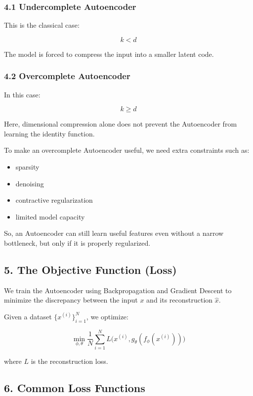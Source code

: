 \documentclass[
  italian,
  11pt,
]{article}
\begin{document}
\subsubsection{4.1 Undercomplete
Autoencoder}\label{undercomplete-autoencoder}

This is the classical case:

\[
k < d
\]

The model is forced to compress the input into a smaller latent code.

\subsubsection{4.2 Overcomplete
Autoencoder}\label{overcomplete-autoencoder}

In this case:

\[
k \ge d
\]

Here, dimensional compression alone does not prevent the Autoencoder
from learning the identity function.

To make an overcomplete Autoencoder useful, we need extra constraints
such as:

\begin{itemize}
\item
  sparsity
\item
  denoising
\item
  contractive regularization
\item
  limited model capacity
\end{itemize}

So, an Autoencoder can still learn useful features even without a narrow
bottleneck, but only if it is properly regularized.

\subsection{5. The Objective Function
(Loss)}\label{the-objective-function-loss}

We train the Autoencoder using Backpropagation and Gradient Descent to
minimize the discrepancy between the input \(x\) and its reconstruction
\(\hat{x}\).

Given a dataset \(\{x^{(i)}\}_{i=1}^N\), we optimize:

\[
\min_{\phi,\theta} \frac{1}{N} \sum_{i=1}^N L\Big(x^{(i)}, g_\theta(f_\phi(x^{(i)}))\Big)
\]

where \(L\) is the reconstruction loss.

\subsection{6. Common Loss Functions}\label{common-loss-functions}
\end{document}
